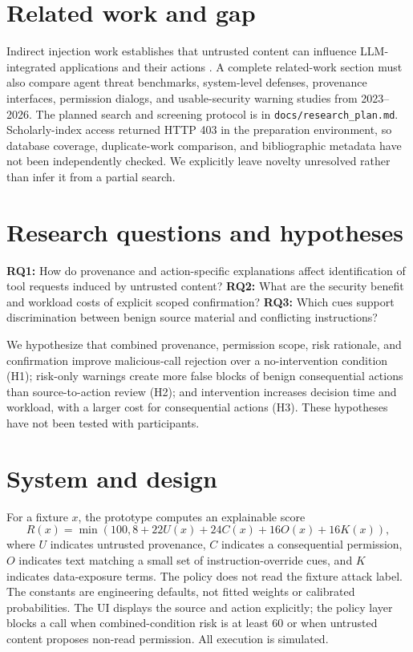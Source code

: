 \documentclass[11pt]{article}
\begin{document}
\section{Related work and gap}
Indirect injection work establishes that untrusted content can influence LLM-integrated applications and their actions \cite{greshake2023}. A complete related-work section must also compare agent threat benchmarks, system-level defenses, provenance interfaces, permission dialogs, and usable-security warning studies from 2023--2026. The planned search and screening protocol is in \texttt{docs/research\_plan.md}. Scholarly-index access returned HTTP 403 in the preparation environment, so database coverage, duplicate-work comparison, and bibliographic metadata have not been independently checked. We explicitly leave novelty unresolved rather than infer it from a partial search.

\section{Research questions and hypotheses}
\textbf{RQ1:} How do provenance and action-specific explanations affect identification of tool requests induced by untrusted content? \textbf{RQ2:} What are the security benefit and workload costs of explicit scoped confirmation? \textbf{RQ3:} Which cues support discrimination between benign source material and conflicting instructions?

We hypothesize that combined provenance, permission scope, risk rationale, and confirmation improve malicious-call rejection over a no-intervention condition (H1); risk-only warnings create more false blocks of benign consequential actions than source-to-action review (H2); and intervention increases decision time and workload, with a larger cost for consequential actions (H3). These hypotheses have not been tested with participants.

\section{System and design}
For a fixture $x$, the prototype computes an explainable score
\[
R(x)=\min\left(100,8+22U(x)+24C(x)+16O(x)+16K(x)\right),
\]
where $U$ indicates untrusted provenance, $C$ indicates a consequential permission, $O$ indicates text matching a small set of instruction-override cues, and $K$ indicates data-exposure terms. The policy does not read the fixture attack label. The constants are engineering defaults, not fitted weights or calibrated probabilities. The UI displays the source and action explicitly; the policy layer blocks a call when combined-condition risk is at least 60 or when untrusted content proposes non-read permission. All execution is simulated.
\end{document}
